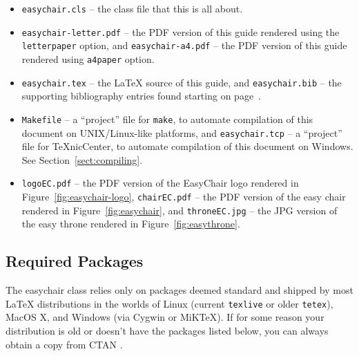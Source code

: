 \documentclass[]{easychair}
\newcommand{\easychair}{\textsf{easychair}}
\newcommand{\miktex}{MiK{\TeX}}
\newcommand{\texniccenter}{{\TeX}nicCenter}
\newcommand{\makefile}{\texttt{Makefile}}
\begin{document}
\begin{itemize}
\item
\texttt{easychair.cls} -- the class file that this is all about.

\item
\texttt{easychair-letter.pdf} -- the PDF version of this guide rendered using 
the \texttt{letterpaper} option, 
and 
\texttt{easychair-a4.pdf} -- the PDF version of this guide rendered using 
\texttt{a4paper} option.

\item
\texttt{easychair.tex} -- the {\LaTeX} source of this guide, 
and
\texttt{easychair.bib} -- the supporting bibliography entries found starting 
on page~\pageref{sect:bib}.

\item
{\makefile} -- a ``project'' file for \texttt{make}, to automate compilation of 
this document on UNIX/Linux-like platforms,
and
\texttt{easychair.tcp} -- a ``project'' file for {\texniccenter}, to automate
compilation of this document on Windows. 
See Section~\ref{sect:compiling}.

\item
\texttt{logoEC.pdf} -- the PDF version of the EasyChair logo rendered in
Figure~\ref{fig:easychair-logo},
\texttt{chairEC.pdf} -- the PDF version of the easy chair rendered in 
Figure~\ref{fig:easychair},
and
\texttt{throneEC.jpg} -- the JPG version of the easy throne rendered in 
Figure~\ref{fig:easythrone}.

\end{itemize}

\subsection{Required Packages}

The {\easychair} class relies only on packages deemed standard and shipped by
most {\LaTeX} distributions in the worlds of Linux (current \texttt{texlive} \cite{texlive}
or older \texttt{tetex}), MacOS X,
and Windows (via Cygwin or {\miktex}).
If for some reason your distribution is old or doesn't have the packages
listed below, you can always obtain a copy from CTAN \cite{ctan}.
\end{document}
